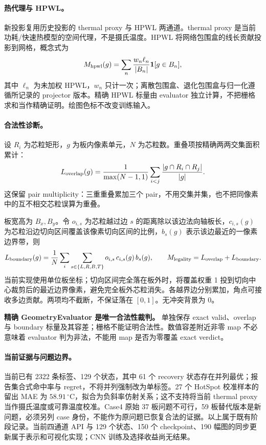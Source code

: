 \documentclass[UTF8,a4paper,11pt]{ctexart}
\begin{document}
\paragraph{热代理与 HPWL。} 新投影复用历史投影的 thermal proxy 与 HPWL 两通道。thermal proxy 是当前功耗/快速热模型的空间代理，不是摄氏温度。HPWL 将网络包围盒的线长贡献投影到网格，概念式为
\[
M_{\rm hpwl}(g)=\sum_n\frac{w_n\ell_n}{|B_n|}\mathbf{1}[g\in B_n],
\]
其中 $\ell_n$ 为未加权 HPWL，$w_n$ 只计一次；离散包围盒、退化包围盒与归一化遵循所记录的 projector 版本。精确 HPWL 标量由 evaluator 独立计算，不把栅格求和当作精确证明。绘图色标不改变训练输入。

\paragraph{合法性诊断。} 设 $R_i$ 为芯粒矩形，$g$ 为板内像素单元，$N$ 为芯粒数。重叠项按精确两两交集面积累计：
\[
L_{\rm overlap}(g)=\frac{1}{\max(N-1,1)}
\sum_{i<j}\frac{|g\cap R_i\cap R_j|}{|g|}.
\]
这保留 pair multiplicity：三重重叠累加三个 pair，不用交集并集，也不把同像素中的互不相交芯粒误算为重叠。

板宽高为 $B_x,B_y$。令 $o_{i,s}$ 为芯粒越过边 $s$ 的距离除以该边法向轴板长，$c_{i,s}(g)$ 为芯粒沿边切向区间覆盖该像素切向区间的比例，$b_s(g)$ 表示该边最近的一像素边界带，则
\[
L_{\rm boundary}(g)=\frac1N\sum_i\sum_{s\in\{L,R,B,T\}}
 o_{i,s}\,c_{i,s}(g)\,b_s(g),\qquad
M_{\rm legality}=L_{\rm overlap}+L_{\rm boundary}.
\]
当前实现使用单位板坐标；切向区间完全落在板外时，将覆盖权重 1 投到切向中心裁剪后的最近边界像素，避免完全板外芯粒消失。各越界边分别累加，角点可接收多边贡献。两项均不截断，不保证落在 $[0,1]$。无冲突背景为 0。

\textbf{精确 GeometryEvaluator 是唯一合法性裁判。} 单独保存 exact valid、overlap 与 boundary 标量及其容差；栅格不能证明合法性。数值容差附近非零 map 不必意味着 evaluator 判为非法，不能用 map 是否为零覆盖 exact verdict。

\paragraph{当前证据与问题边界。} 当前已有 2322 条标签、129 个状态，其中 61 个 recovery 状态存在并列最优；报告集合式命中率与 regret，不将并列强制改为单标签。27 个 HotSpot 校准样本的留出 MAE 为 $58.91\,{}^\circ\mathrm{C}$，拟合为负斜率仿射关系；这不支持将当前 thermal proxy 当作摄氏温度或可靠温度校准。Case4 原始 37 板问题不可行，59 板替代版本是新问题，必须另列 case 身份，不能作为原问题已恢复合法的证据。以上属于既有阶段记录。当前四通道 API 与 129 个状态、150 个 checkpoint、190 幅图的同步更新属于表示和可视化实现；CNN 训练及选择收益尚无结果。
\end{document}
